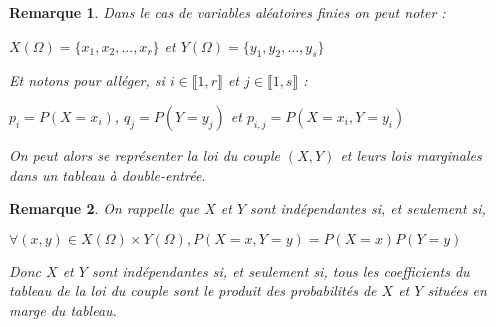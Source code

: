 \documentclass[a4paper,12pt]{book}
\newtheorem{Rem}{Remarque}[section]
\begin{document}
\begin{Rem}
Dans le cas de variables aléatoires finies on peut noter : \par\begin{center}$X(\Omega)=\{x_1,x_2,...,x_r\}$ et $Y(\Omega)=\{y_1,y_2,...,y_s\}$\end{center}
\par Et notons pour alléger, si $i\in\llbracket 1,r\rrbracket$ et $j\in\llbracket 1,s\rrbracket$ :\par\begin{center} $p_i=P(X=x_i)$, $q_j=P(Y=y_j)$ et $p_{i,j}=P(X=x_i, Y=y_i)$\end{center}
\par On peut alors se représenter la loi du couple $(X,Y)$ et leurs lois marginales dans un tableau à double-entrée.
\end{Rem}
\begin{Rem}
On rappelle que $X$ et $Y$ sont indépendantes si, et seulement si,
\par\begin{center}$\forall (x,y)\in X(\Omega)\times Y(\Omega), P(X=x, Y=y)=P(X=x)P(Y=y)$\end{center}
\par Donc $X$ et $Y$ sont indépendantes si, et seulement si, tous les coefficients du tableau de la loi du couple sont le produit des probabilités de $X$ et $Y$ situées en marge du tableau.
\end{Rem}
\end{document}
